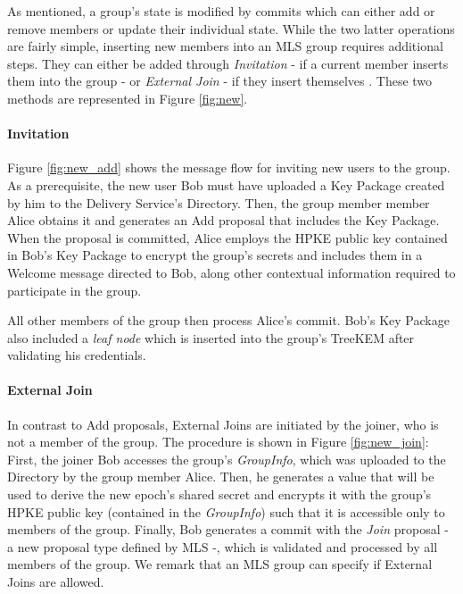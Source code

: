 \documentclass[preprint, 12pt]{elsarticle}
\begin{document}
As mentioned, a group's state is modified by commits which can either add or remove members or update their individual state. While the two latter operations are fairly simple, inserting new members into an MLS group requires additional steps. They can either be added through \textit{Invitation} - if a current member inserts them into the group - or \textit{External Join} - if they insert themselves \cite{aa_cgka}. These two methods are represented in Figure \ref{fig:new}.

\paragraph{\textbf{Invitation}}

Figure \ref{fig:new_add} shows the message flow for inviting new users to the group. As a prerequisite, the new user Bob must have uploaded a Key Package created by him to the Delivery Service's Directory. Then, the group member member Alice obtains it and generates an Add proposal that includes the Key Package. When the proposal is committed, Alice employs the HPKE public key contained in Bob's Key Package to encrypt the group's secrets and includes them in a Welcome message directed to Bob, along other contextual information required to participate in the group.

All other members of the group then process Alice's commit. Bob's Key Package also included a \textit{leaf node} which is inserted into the group's TreeKEM after validating his credentials.

\paragraph{\textbf{External Join}}

In contrast to Add proposals, External Joins are initiated by the joiner, who is not a member of the group. The procedure is shown in Figure \ref{fig:new_join}: First, the joiner Bob accesses the group's \textit{GroupInfo}, which was uploaded to the Directory by the group member Alice. Then, he generates a value that will be used to derive the new epoch's shared secret and encrypts it with the group's HPKE public key (contained in the \textit{GroupInfo}) such that it is accessible only to members of the group. Finally, Bob generates a commit with the \textit{Join} proposal - a new proposal type defined by MLS -, which is validated and processed by all members of the group. We remark that an MLS group can specify if External Joins are allowed.
\end{document}
